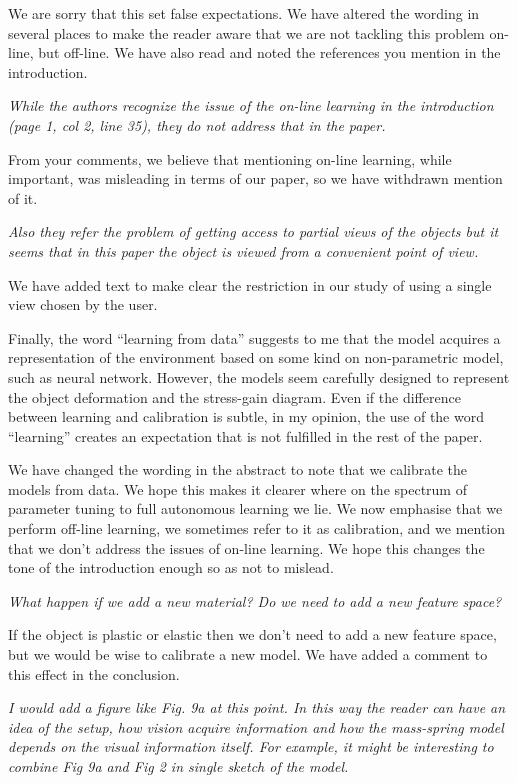 \documentclass[letterpaper,12pt]{letter}
\begin{document}
We are sorry that this set false expectations. We have altered the wording in several places to make the reader aware that we are not tackling this problem on-line, but off-line. We have also read and noted the references you mention in the introduction.

\emph{While the authors recognize the issue of the on-line learning in the introduction (page 1, col 2, line 35), they do not address that in the paper.}

From your comments, we believe that mentioning on-line learning, while important, was misleading in terms of our paper, so we have withdrawn mention of it.

\emph{Also they refer the problem of getting access to partial views of the objects but it seems that in this paper the object is viewed from a convenient point of view.}

We have added text to make clear the restriction in our study of using a single view chosen by the user.

Finally, the word “learning from data” suggests to me that the model acquires a representation of the environment based on some kind on non-parametric model, such as neural network. However, the models seem carefully designed to represent the object deformation and the stress-gain diagram. Even if the difference between learning and calibration is subtle, in my opinion, the use of the word “learning” creates an expectation that is not fulfilled in the rest of the paper.

We have changed the wording in the abstract to note that we calibrate the models from data. We hope this makes it clearer where on the spectrum of parameter tuning to full autonomous learning we lie. We now emphasise that we perform off-line learning, we sometimes refer to it as calibration, and we mention that we don’t address the issues of on-line learning. We hope this changes the tone of the introduction enough so as not to mislead.

\emph{What happen if we add a new material? Do we need to add a new feature space?}

If the object is plastic or elastic then we don’t need to add a new feature space, but we would be wise to calibrate a new model. We have added a comment to this effect in the conclusion.

\emph{I would add a figure like Fig. 9a at this point. In this way the reader can have an idea of the setup, how vision acquire information and how the mass-spring model depends on the visual information itself. For example, it might be interesting to combine Fig 9a and Fig 2 in single sketch of the model.}
\end{document}
